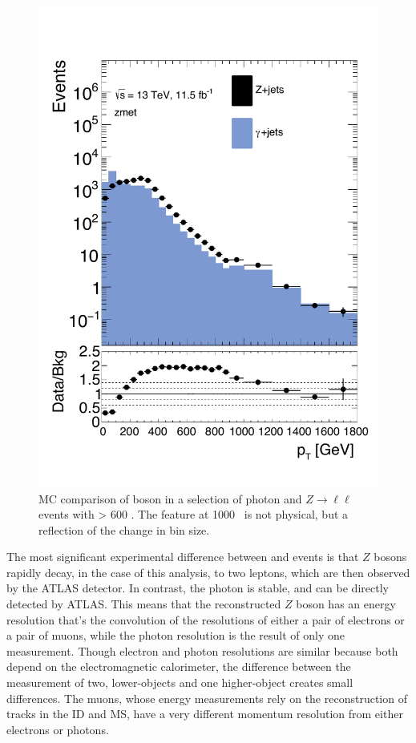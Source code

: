 \begin{centering}
\begin{figure}[!hbt]
\myfloatalign
\includegraphics[width=.85\linewidth]{figures/photons/MC_hist_pt_0_SF_2j_2016_mcmetl___zmet_.pdf}
\caption{\ac{MC} comparison of boson \pt in a selection of photon and $Z\rightarrow\ell\ell$ events with \HT > 600 \gev. The feature at 1000 \gev~is not physical, but a reflection of the change in bin size. }
\label{fig:photon_ptdist}
\end{figure}
\end{centering}

The most significant experimental difference between \dyjets and \gjets events is that $Z$ bosons rapidly decay, in the case of this analysis, to two leptons, which are then observed by the \ac{ATLAS} detector. In contrast, the photon is stable, and can be directly detected by \ac{ATLAS}. This means that the reconstructed $Z$ boson has an energy resolution that's the convolution of the resolutions of either a pair of electrons or a pair of muons, while the photon resolution is the result of only one measurement. Though electron and photon resolutions are similar because both depend on the electromagnetic calorimeter, the difference between the measurement of two, lower-\pt objects and one higher-\pt object creates small differences. The muons, whose energy measurements rely on the reconstruction of tracks in the \ac{ID} and \ac{MS}, have a very different momentum resolution from either electrons or photons. 

